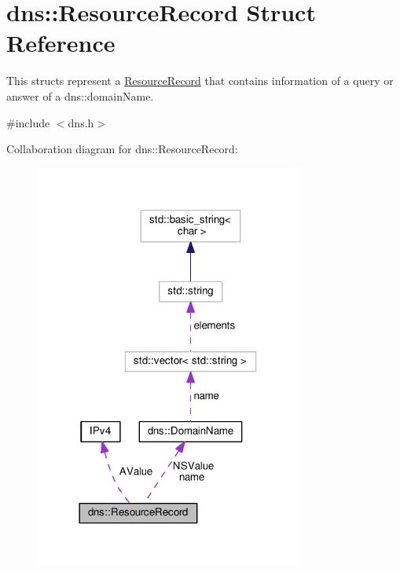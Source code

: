 \hypertarget{structdns_1_1ResourceRecord}{}\section{dns\+:\+:Resource\+Record Struct Reference}
\label{structdns_1_1ResourceRecord}


This structs represent a \hyperlink{structdns_1_1ResourceRecord}{Resource\+Record} that contains information of a query or answer of a dns\+::domain\+Name.  




{\ttfamily \#include $<$dns.\+h$>$}



Collaboration diagram for dns\+:\+:Resource\+Record\+:\nopagebreak
\begin{figure}[H]
\begin{center}
\leavevmode
\includegraphics[width=249pt]{structdns_1_1ResourceRecord__coll__graph}
\end{center}
\end{figure}
